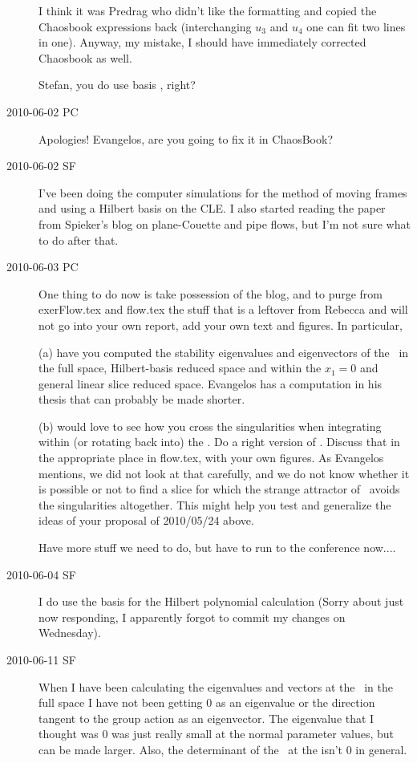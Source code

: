 \begin{description}
I think it was Predrag who didn't like the formatting and copied
the Chaosbook expressions back (interchanging $u_3$ and $u_4$ one
can fit two lines in one). Anyway, my mistake, I should have immediately
corrected Chaosbook as well.

Stefan, you do use basis , right?

\item[2010-06-02 PC] Apologies! Evangelos, are you going to fix it in ChaosBook?

\item[2010-06-02 SF]
I've been doing the computer simulations for the method of moving frames
and using a Hilbert basis on the CLE. I also started reading the paper from
Spieker's blog on plane-Couette and pipe flows, but I'm not sure what to do
after that.

\item[2010-06-03 PC]
One thing to do now is take possession of the blog,
and to purge from exerFlow.tex and flow.tex the stuff
that is a leftover from Rebecca and will not go into your own report,
add your own text and figures. In particular,

(a) have you computed the
stability eigenvalues and eigenvectors of the \reqv\ in
the full space, Hilbert-basis reduced space and within the $x_1=0$ and
general linear slice reduced space. Evangelos has a computation in his thesis
that can probably be made shorter.

(b) would love to see how you cross the singularities when integrating
within (or rotating back into) the \reducedsp. Do a right version
of . Discuss that in the appropriate
place in flow.tex, with your own figures. As Evangelos mentions, we
did not look at that carefully, and we do not know whether it is
possible or not to find a slice for which the strange attractor
of \cLe\ avoids the singularities altogether.
This might help you test and generalize the ideas
of your proposal of 2010/05/24 above.

Have more stuff we need to do, but have to run to the conference now....

\item[2010-06-04 SF]
I do use the basis  for the Hilbert polynomial calculation (Sorry about just now responding, I apparently forgot to commit my changes on Wednesday).

\item[2010-06-11 SF]
When I have been calculating the eigenvalues and vectors at the \reqv\ in the full space I have not been getting 0 as an eigenvalue or the direction tangent to the group action as an eigenvector. The eigenvalue that I thought was 0 was just really small at the normal parameter values, but can be made larger. Also, the determinant of the \stabmat\ at the {\reqv} isn't 0 in general.


\end{description}
